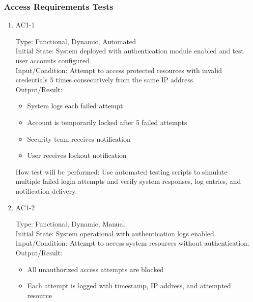 \documentclass[12pt, titlepage]{article}
\begin{document}
\subsubsection{Access Requirements Tests}
\begin{enumerate}
    \item{AC1-1\\}
    
    Type: Functional, Dynamic, Automated\\
    
    Initial State: System deployed with authentication module enabled and test user accounts configured.\\
    
    Input/Condition: Attempt to access protected resources with invalid credentials 5 times consecutively from the same IP address.\\
    
    Output/Result: 
    \begin{itemize}
        \item System logs each failed attempt
        \item Account is temporarily locked after 5 failed attempts
        \item Security team receives notification
        \item User receives lockout notification
    \end{itemize}
    
    How test will be performed: Use automated testing scripts to simulate multiple failed login attempts and verify system responses, log entries, and notification delivery.

    \item{AC1-2\\}
    
    Type: Functional, Dynamic, Manual\\
    
    Initial State: System operational with authentication logs enabled.\\
    
    Input/Condition: Attempt to access system resources without authentication.\\
    
    Output/Result: 
    \begin{itemize}
        \item All unauthorized access attempts are blocked
        \item Each attempt is logged with timestamp, IP address, and attempted resource
    \end{itemize}
    

\end{enumerate}
\end{document}
